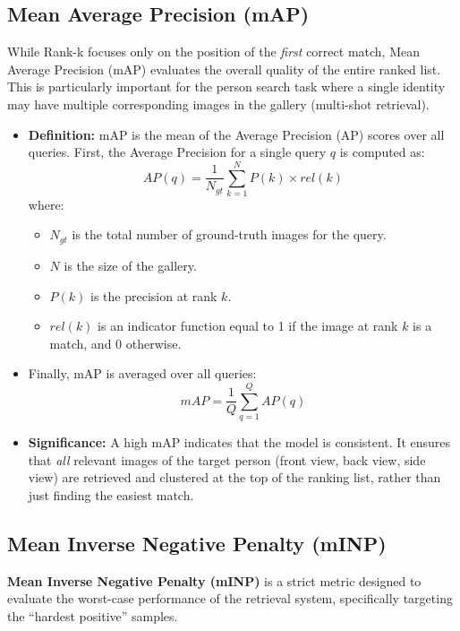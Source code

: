 \documentclass[../main.tex]{subfiles}
\begin{document}
\subsection{Mean Average Precision (mAP)}

\noindent While Rank-k focuses only on the position of the \textit{first} correct match, Mean Average Precision (mAP) evaluates the overall quality of the entire ranked list. This is particularly important for the person search task where a single identity may have multiple corresponding images in the gallery (multi-shot retrieval).

\begin{itemize}
    \item \textbf{Definition:} mAP is the mean of the Average Precision (AP) scores over all queries. First, the Average Precision for a single query $q$ is computed as:
    \[
    AP(q) = \frac{1}{N_{gt}} \sum_{k=1}^{N} P(k) \times rel(k)
    \]
    where:
    \begin{itemize}
        \item $N_{gt}$ is the total number of ground-truth images for the query.
        \item $N$ is the size of the gallery.
        \item $P(k)$ is the precision at rank $k$.
        \item $rel(k)$ is an indicator function equal to 1 if the image at rank $k$ is a match, and 0 otherwise.
    \end{itemize}

    \item Finally, mAP is averaged over all queries:
    \[
    mAP = \frac{1}{Q} \sum_{q=1}^{Q} AP(q)
    \]

    \item \textbf{Significance:} A high mAP indicates that the model is consistent. It ensures that \textit{all} relevant images of the target person (front view, back view, side view) are retrieved and clustered at the top of the ranking list, rather than just finding the easiest match.
\end{itemize}

\subsection{Mean Inverse Negative Penalty (mINP)}

\noindent \textbf{Mean Inverse Negative Penalty (mINP)} is a strict metric designed to evaluate the worst-case performance of the retrieval system, specifically targeting the ``hardest positive'' samples.
\end{document}
